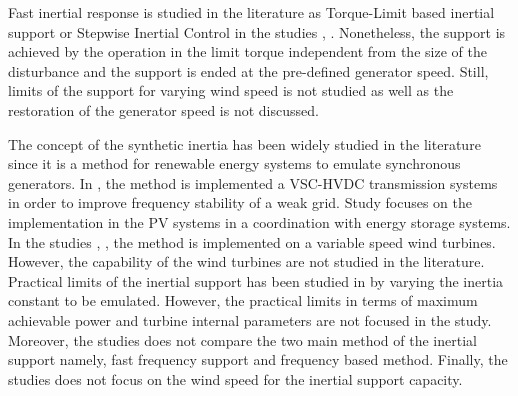 Fast inertial response is studied in the literature as Torque-Limit based inertial support or Stepwise Inertial Control in the studies \cite{Wang2016b}, \cite{Wang2016}. Nonetheless, the support is achieved by the operation in the limit torque independent from the size of the disturbance and the support is ended at the pre-defined generator speed. Still, limits of the support for varying wind speed is not studied as well as the restoration of the generator speed is not discussed. \par
The concept of the synthetic inertia has been widely studied in the literature since it is a method for renewable energy systems to emulate synchronous generators. In \cite{Zhu2013a}, the method is implemented a VSC-HVDC transmission systems in order to improve frequency stability of a weak grid. Study \cite{Hernandez2017} focuses on the implementation in the PV systems in a coordination with energy storage systems. In the studies \cite{VanDeVyver2016}, \cite{Conroy2008}, the method is implemented on a variable speed wind turbines. However, the capability of the wind turbines are not studied in the literature. 
Practical limits of the inertial support has been studied in \cite{Gonzalez-Longatt2016} by varying the inertia constant to be emulated. However, the practical limits in terms of maximum achievable power and turbine internal parameters are not focused in the study. Moreover, the studies does not compare the two main method of the inertial support namely, fast frequency support and frequency based method. Finally, the studies does not focus on the wind speed for the inertial support capacity. 

